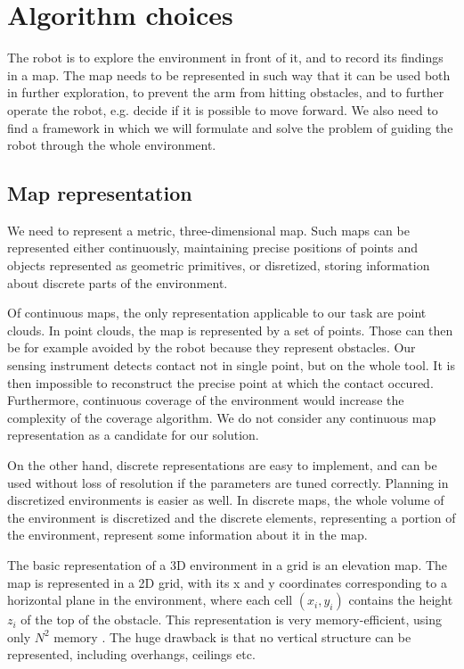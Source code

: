 \documentclass[buriama8_dp.tex]{subfiles}
\begin{document}
\chapter{Algorithm choices}

The robot is to explore the environment in front of it, and to record its findings in a map. The map needs to be represented in such way that it can be used both in further exploration, to prevent the arm from hitting obstacles, and to further operate the robot, e.g. decide if it is possible to move forward. We also need to find a framework in which we will formulate and solve the problem of guiding the robot through the whole environment.

\section{Map representation}

We need to represent a metric, three-dimensional map. Such maps can be represented either continuously, maintaining precise positions of points and objects represented as geometric primitives, or disretized, storing information about discrete parts of the environment.

Of continuous maps, the only representation applicable to our task are point clouds. In point clouds, the map is represented by a set of points. Those can then be for example avoided by the robot because they represent obstacles. Our sensing instrument detects contact not in single point, but on the whole tool. It is then impossible to reconstruct the precise point at which the contact occured. Furthermore, continuous coverage of the environment would increase the complexity of the coverage algorithm. We do not consider any continuous map representation as a candidate for our solution.

On the other hand, discrete representations are easy to implement, and can be used without loss of resolution if the parameters are tuned correctly. Planning in discretized environments is easier as well. In discrete maps, the whole volume of the environment is discretized and the discrete elements, representing a portion of the environment, represent some information about it in the map.

The basic representation of a 3D environment in a grid is an elevation map. The map is represented in a 2D grid, with its \m x and \m y coordinates corresponding to a horizontal plane in the environment, where each cell \((x_i, y_i)\) contains the height \(z_i\) of the top of the obstacle. This representation is very memory-efficient, using only \(N^2\) memory . The huge drawback is that no vertical structure can be represented, including overhangs, ceilings etc.
\end{document}
